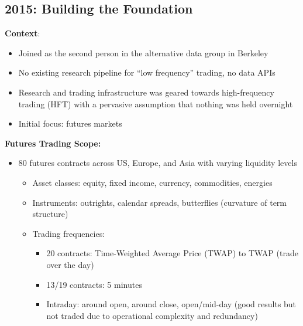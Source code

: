 \documentclass[11pt, letterpaper]{article}
\begin{document}
  \subsection{2015: Building the Foundation}
  \label{building-the-foundation}

  \textbf{Context}:

  \begin{itemize}
    \item Joined as the second person in the alternative data group in Berkeley

    \item No existing research pipeline for ``low frequency'' trading,
      no data APIs

    \item Research and trading infrastructure was geared towards high-frequency
      trading (HFT) with a pervasive assumption that nothing was held overnight

    \item Initial focus: futures markets
  \end{itemize}

  \textbf{Futures Trading Scope:}

  \begin{itemize}
    \item 80 futures contracts across US, Europe, and Asia with varying liquidity
      levels

      \begin{itemize}
        \item Asset classes: equity, fixed income, currency, commodities,
          energies

        \item Instruments: outrights, calendar spreads, butterflies (curvature
          of term structure)

        \item Trading frequencies:

          \begin{itemize}
            \item 20 contracts: Time-Weighted Average Price (TWAP) to
              TWAP (trade over the day)

            \item 13/19 contracts: 5 minutes

            \item Intraday: around open, around close, open/mid-day (good
              results but not traded due to operational complexity and redundancy)
          \end{itemize}
      \end{itemize}
  \end{itemize}
\end{document}
